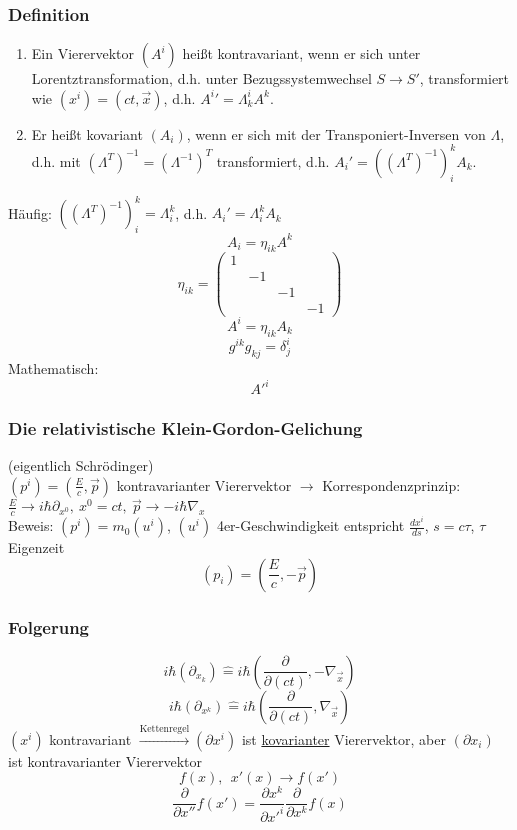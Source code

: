 \documentclass[twoside,a4paper]{scrartcl}
\renewcommand{\1}{\mathds{1}}
\newcommand{\ra}{\rightarrow}
\newcommand{\entspricht}{\mathrel{\widehat{=}}}
\renewcommand{\L}{\Lambda}
\begin{document}
\subsubsection*{Definition}
\begin{enumerate}
\item Ein Vierervektor $(A^i)$ heißt kontravariant, wenn er sich unter Lorentztransformation, d.h. unter Bezugssystemwechsel $S \ra S'$, transformiert wie $(x^i)=(ct,\vec x)$, d.h. ${A^i}'=\L_k^iA^k$.
\item Er heißt kovariant $(A_i)$, wenn er sich mit der Transponiert-Inversen von $\L$, d.h. mit $(\L^T)^{-1}=(\L^{-1})^T$ transformiert, d.h. $A_i'=((\L^T)^{-1})^k_i A_k$.
\end{enumerate}
Häufig: $((\L^{T})^{-1})^k_i=\L_i^k$, d.h. $A_i'= \L_i^k A_k$
$$A_i=\eta_{ik}A^k$$
$$\eta_{ik}=\begin{pmatrix}1 \\ & -1 \\ & & -1 \\ & & & -1\end{pmatrix}$$
$$A^i=\eta_{ik}A_k$$
$$g^{ik}g_{kj}=\delta_j^i$$
Mathematisch:
$$A'^i$$

\subsubsection{Die relativistische Klein-Gordon-Gelichung}
(eigentlich Schrödinger)\\
$(p^i)=(\frac{E}{c}, \vec p)$ kontravarianter Vierervektor $\ra$ Korrespondenzprinzip:\\ $\frac{E}{c} \ra i\hbar \partial_{x^0}, \ x^0=ct, \ \vec p \ra -i \hbar\nabla_x$\\
Beweis: $(p^i)=m_0(u^i)$, $(u^i)$ 4er-Geschwindigkeit entspricht $\frac{dx^i}{ds}$, $s=c\tau$, $\tau$ Eigenzeit\\
$$(p_i)=(\frac{E}{c},-\vec p)$$

\subsubsection*{Folgerung}
$$i \hbar (\partial_{x_k})\entspricht i \hbar(\frac{\partial}{\partial (ct)},-\nabla_{\vec x})$$
$$i \hbar (\partial_{x^k})\entspricht i \hbar(\frac{\partial}{\partial (ct)},\nabla_{\vec x})$$
$(x^i)$ kontravariant $\stackrel{\mathrm{Kettenregel}}{\ra} (\partial x^i)$ ist \underline{kovarianter} Vierervektor, aber $(\partial x_i)$ ist kontravarianter Vierervektor\\
$$f(x), \ \ x'(x) \ra f(x')$$
$$\frac{\partial}{\partial x''}f(x')=\frac{\partial x^k}{\partial x'^i}\frac{\partial}{\partial x^k}f(x)$$
\end{document}
